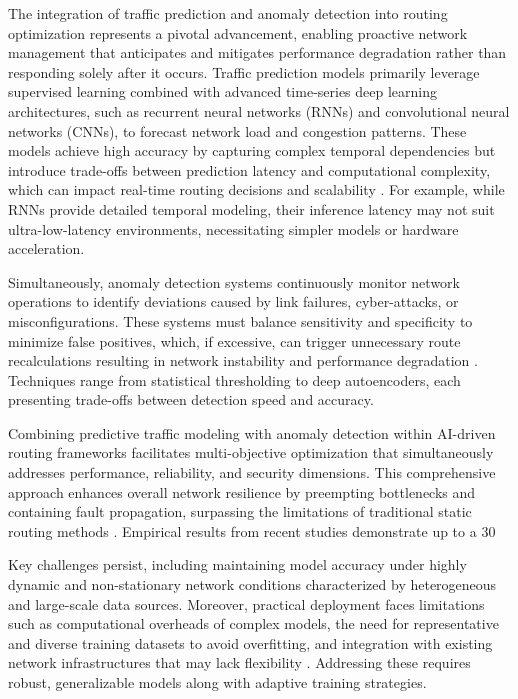 \documentclass[sigconf]{acmart}
\begin{document}
The integration of traffic prediction and anomaly detection into routing optimization represents a pivotal advancement, enabling proactive network management that anticipates and mitigates performance degradation rather than responding solely after it occurs. Traffic prediction models primarily leverage supervised learning combined with advanced time-series deep learning architectures, such as recurrent neural networks (RNNs) and convolutional neural networks (CNNs), to forecast network load and congestion patterns. These models achieve high accuracy by capturing complex temporal dependencies but introduce trade-offs between prediction latency and computational complexity, which can impact real-time routing decisions and scalability \cite{ref50}. For example, while RNNs provide detailed temporal modeling, their inference latency may not suit ultra-low-latency environments, necessitating simpler models or hardware acceleration.

Simultaneously, anomaly detection systems continuously monitor network operations to identify deviations caused by link failures, cyber-attacks, or misconfigurations. These systems must balance sensitivity and specificity to minimize false positives, which, if excessive, can trigger unnecessary route recalculations resulting in network instability and performance degradation \cite{ref53}. Techniques range from statistical thresholding to deep autoencoders, each presenting trade-offs between detection speed and accuracy.

Combining predictive traffic modeling with anomaly detection within AI-driven routing frameworks facilitates multi-objective optimization that simultaneously addresses performance, reliability, and security dimensions. This comprehensive approach enhances overall network resilience by preempting bottlenecks and containing fault propagation, surpassing the limitations of traditional static routing methods \cite{ref53}. Empirical results from recent studies demonstrate up to a 30%

Key challenges persist, including maintaining model accuracy under highly dynamic and non-stationary network conditions characterized by heterogeneous and large-scale data sources. Moreover, practical deployment faces limitations such as computational overheads of complex models, the need for representative and diverse training datasets to avoid overfitting, and integration with existing network infrastructures that may lack flexibility \cite{ref50, ref53}. Addressing these requires robust, generalizable models along with adaptive training strategies.
\end{document}
